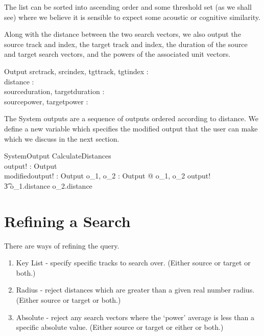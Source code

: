 \documentclass[11pt]{article}
\begin{document}
\begin{enumerate}
The list can be sorted into ascending order and some threshold set (as we shall see) where we believe it is sensible to expect some acoustic or cognitive similarity. 

Along with the distance between the two search vectors, we also output the source track and index, the target track and index, the duration of the source and target search vectors, and the powers of the associated unit vectors.

\begin{schema}{Output}
	srctrack, srcindex, tgttrack, tgtindex : \nat \\
	distance : \R  \\
	sourceduration, targetduration : \R \\
	sourcepower, targetpower : \R \\
\end{schema} 

The System outputs are a sequence of outputs ordered according to distance. We define a new variable which specifies the modified output that the user can make which we discuss in the next section. 

\begin{schema}{SystemOutput}
	CalculateDistances \\
	output! : \seq Output \\
	modifiedoutput! : \seq Output
\where
	\forall o_1, o_2 : Output @ \langle o_1, o_2 \rangle \inseq output! \\
	\t3 \implies o_1.distance \leq o_2.distance 
\end{schema}

\section{Refining a Search}
\label{s:refining}

There are ways of refining the query. 

\begin{enumerate}

\item \textsf{Key List} -  specify specific tracks to search over.  (Either source or target or both.) 

\item \textsf{Radius} - reject distances which are greater than a given real number radius. (Either source or target or both.) 

\item \textsf{Absolute} - reject any search vectors where the `power' average  is less than a specific absolute value. (Either source or target or either or both.) 


\end{enumerate}
\end{enumerate}
\end{document}
